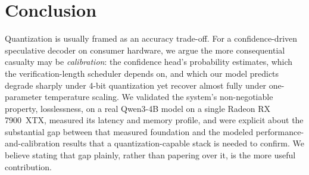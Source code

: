 \documentclass[11pt]{article}
\theoremstyle{plain}
\theoremstyle{definition}
\begin{document}
\section{Conclusion}
Quantization is usually framed as an accuracy trade-off. For a confidence-driven
speculative decoder on consumer hardware, we argue the more consequential
casualty may be \emph{calibration}: the confidence head's probability estimates,
which the verification-length scheduler depends on, and which our model predicts
degrade sharply under 4-bit quantization yet recover almost fully under
one-parameter temperature scaling. We validated the system's non-negotiable
property, losslessness, on a real Qwen3-4B model on a single Radeon RX 7900~XTX,
measured its latency and memory profile, and were explicit about the substantial
gap between that measured foundation and the modeled performance-and-calibration
results that a quantization-capable stack is needed to confirm. We believe stating
that gap plainly, rather than papering over it, is the more useful contribution.

\small


\end{document}
